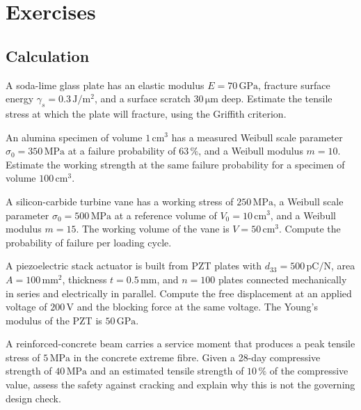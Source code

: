 \section{Exercises}

\subsection*{Calculation}

\begin{exercise}
A soda-lime glass plate has an elastic modulus $E = 70\,\text{GPa}$,
fracture surface energy $\gamma_s = 0.3\,\text{J}/\text{m}^2$, and a
surface scratch $30\,\si{\micro\meter}$ deep. Estimate the tensile
stress at which the plate will fracture, using the Griffith criterion.
\end{exercise}

\begin{exercise}
An alumina specimen of volume $1\,\text{cm}^3$ has a measured Weibull
scale parameter $\sigma_0 = 350\,\text{MPa}$ at a failure probability
of $63\,\%$, and a Weibull modulus $m = 10$. Estimate the working
strength at the same failure probability for a specimen of volume
$100\,\text{cm}^3$.
\end{exercise}

\begin{exercise}
A silicon-carbide turbine vane has a working stress of $250\,\text{MPa}$,
a Weibull scale parameter $\sigma_0 = 500\,\text{MPa}$ at a reference
volume of $V_0 = 10\,\text{cm}^3$, and a Weibull modulus $m = 15$. The
working volume of the vane is $V = 50\,\text{cm}^3$. Compute the
probability of failure per loading cycle.
\end{exercise}

\begin{exercise}
A piezoelectric stack actuator is built from PZT plates with $d_{33} =
500\,\text{pC}/\text{N}$, area $A = 100\,\text{mm}^2$, thickness
$t = 0.5\,\text{mm}$, and $n = 100$ plates connected mechanically in
series and electrically in parallel. Compute the free displacement at
an applied voltage of $200\,\text{V}$ and the blocking force at the
same voltage. The Young's modulus of the PZT is $50\,\text{GPa}$.
\end{exercise}

\begin{exercise}
A reinforced-concrete beam carries a service moment that produces a
peak tensile stress of $5\,\text{MPa}$ in the concrete extreme fibre.
Given a 28-day compressive strength of $40\,\text{MPa}$ and an
estimated tensile strength of $10\,\%$ of the compressive value,
assess the safety against cracking and explain why this is not the
governing design check.
\end{exercise}

